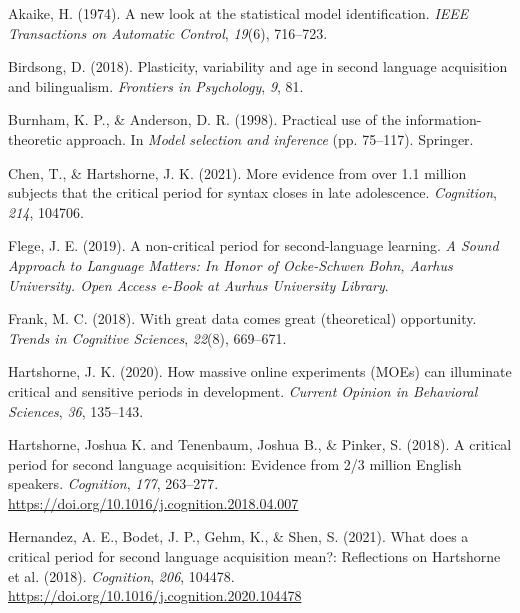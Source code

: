 \documentclass[
  english,
  doc,floatsintext]{apa6}
\newlength{\cslhangindent}
\newlength{\cslentryspacingunit} %
\newenvironment{CSLReferences}[2] %
 {%
  \setlength{\parindent}{0pt}
  \ifodd #1
  \let\oldpar\par
  \def\par{\hangindent=\cslhangindent\oldpar}
  \fi
  \setlength{\parskip}{#2\cslentryspacingunit}
 }%
 {}
\begin{document}
\hypertarget{refs}{}
\begin{CSLReferences}{1}{0}
\leavevmode{}%
Akaike, H. (1974). A new look at the statistical model identification. \emph{IEEE Transactions on Automatic Control}, \emph{19}(6), 716--723.

\leavevmode{}%
Birdsong, D. (2018). Plasticity, variability and age in second language acquisition and bilingualism. \emph{Frontiers in Psychology}, \emph{9}, 81.

\leavevmode{}%
Burnham, K. P., \& Anderson, D. R. (1998). Practical use of the information-theoretic approach. In \emph{Model selection and inference} (pp. 75--117). Springer.

\leavevmode{}%
Chen, T., \& Hartshorne, J. K. (2021). More evidence from over 1.1 million subjects that the critical period for syntax closes in late adolescence. \emph{Cognition}, \emph{214}, 104706.

\leavevmode{}%
Flege, J. E. (2019). A non-critical period for second-language learning. \emph{A Sound Approach to Language Matters: In Honor of Ocke-Schwen Bohn, Aarhus University. Open Access e-Book at Aurhus University Library}.

\leavevmode{}%
Frank, M. C. (2018). With great data comes great (theoretical) opportunity. \emph{Trends in Cognitive Sciences}, \emph{22}(8), 669--671.

\leavevmode{}%
Hartshorne, J. K. (2020). How massive online experiments (MOEs) can illuminate critical and sensitive periods in development. \emph{Current Opinion in Behavioral Sciences}, \emph{36}, 135--143.

\leavevmode{}%
Hartshorne, Joshua K. and Tenenbaum, Joshua B., \& Pinker, S. (2018). A critical period for second language acquisition: Evidence from 2/3 million English speakers. \emph{Cognition}, \emph{177}, 263--277. \url{https://doi.org/10.1016/j.cognition.2018.04.007}

\leavevmode{}%
Hernandez, A. E., Bodet, J. P., Gehm, K., \& Shen, S. (2021). What does a critical period for second language acquisition mean?: Reflections on Hartshorne et al. (2018). \emph{Cognition}, \emph{206}, 104478. \url{https://doi.org/10.1016/j.cognition.2020.104478}


\end{CSLReferences}
\end{document}
